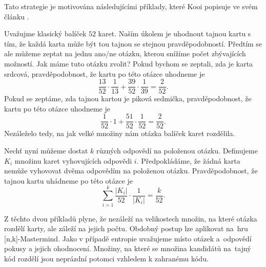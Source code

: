 Tato strategie je motivována následujícími příklady, které Kooi popisuje ve svém článku \cite{kooi}. 

\begin{prikl}\label{prdvecasti}
    Uvažujme klasický balíček $52$ karet. Naším úkolem je uhodnout tajnou kartu s tím, že každá karta může být tou tajnou se stejnou pravděpodobností. Předtím se ale můžeme zeptat na jednu ano/ne otázku, kterou snížíme počet zbývajících možností. Jak máme tuto otázku zvolit? 
    Pokud bychom se zeptali, zda je karta srdcová, pravděpodobnost, že kartu po této otázce uhodneme je 
    \[\frac{13}{52} \cdot \frac{1}{13} + \frac{39}{52} \cdot \frac{1}{39} = \frac{2}{52}.\]
    Pokud se zeptáme, zda tajnou kartou je piková sedmička, pravděpodobnost, že kartu po této otázce uhodneme je 
     \[\frac{1}{52} \cdot 1 + \frac{51}{52} \cdot \frac{1}{52} = \frac{2}{52}.\] 
    Nezáleželo tedy, na jak velké množiny nám otázka balíček karet rozdělila. 
\end{prikl}\textbf{}

\begin{prikl}
    Nechť nyní můžeme dostat $k$ různých odpovědí na položenou otázku. Definujeme $K_i$ množinu karet vyhovujících odpovědi $i$. Předpokládáme, že žádná karta nemůže vyhovovat dvěma odpovědím na položenou otázku. Pravděpodobnost, že tajnou kartu uhádneme po této otázce je 
\[\sum_{i = 1}^k \frac{|K_i|}{52} \cdot \frac{1}{|K_i|} = \frac{k}{52}.\]
\end{prikl}


Z těchto dvou příkladů plyne, že nezáleží na velikostech množin, na které otázka rozdělí karty, ale záleží na jejich počtu. Obdobný postup lze aplikovat na~hru [n,k]-Mastermind. Jako v případě entropie uvažujeme místo otázek a~odpovědí pokusy a jejich ohodnocení. Množiny, na které se množina kandidátů na~tajný kód rozdělí jsou neprázdní potomci vzhledem k zahranému kódu. 











